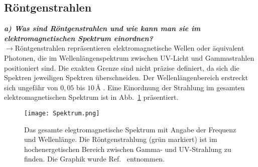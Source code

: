 \subsection{\label{subsec:FZV1}Röntgenstrahlen}
\textbf{\textit{a) Was sind Röntgenstrahlen und wie kann man sie im elektromagnetischen
Spektrum einordnen?}}\\
$\rightarrow$Röntgenstrahlen repräsentieren elektromagnetische Wellen oder äquivalent Photonen, 
die im Wellenlängenspektrum zwischen UV-Licht und Gammastrahlen positioniert sind. 
Die exakten Grenze sind nicht präzise definiert, da sich die Spektren jeweiligen Spektren überschneiden. 
Der Wellenlängenbereich erstreckt sich ungefähr von $0,05$ bis $10\,\si{\angstrom}$ \cite{Anleitung}.
Eine Einordnung der Strahlung im gesamten elektromagnetischen Spektrum ist in Abb.~\ref{fig:spektrum}
präsentiert.
\begin{figure}[h!]
    \centering
    \texttt{[image: Spektrum.png]}
    \caption{\label{fig:spektrum}Das gesamte elegtromagnetische Spektrum mit Angabe der Frequenz und Wellenlänge.
    Die Röntgenstrahlung (grün markiert) ist im hochenergetischen Bereich zwischen Gamma- und 
    UV-Strahlung zu finden. Die Graphik wurde Ref.~\cite{Spektrum} entnommen.}
\end{figure}  \FloatBarrier \,\\

